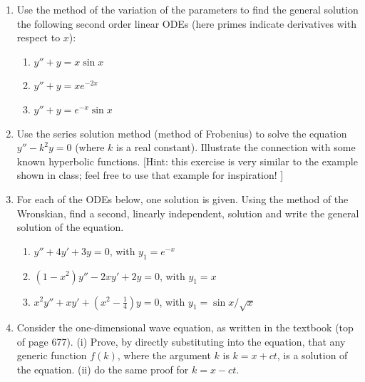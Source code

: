 \documentclass[fleqn]{article}
\begin{document}
  \begin{enumerate}
    \item Use the method of the variation of the parameters to find the general solution the following second order linear ODEs (here primes indicate derivatives with respect to $x$): 
      \begin{enumerate}
      \item $y'' + y = x \sin x$

      \item $y'' + y = x e^{-2x }$

      \item $y'' + y = e^{-x} \sin x$ 
      \end{enumerate}

    \item Use the series solution method (method of Frobenius) to solve the equation $y'' - k^2 y =0$ (where $k$ is a real constant).  Illustrate the connection with some known hyperbolic functions. [Hint: this exercise is very similar to the example shown in class; feel free to use that example for inspiration! ]
    
    \item  For each of the ODEs below, one solution is given. Using the method of the Wronskian, find a second, linearly independent, solution and write the general solution of the equation. 
      \begin{enumerate}
      \item $y'' + 4 y' + 3 y =0 $, with $y_1= e^{-x}$

      \item $(1-x^2) y'' - 2 x y' + 2y=0 $, with $y_1= x $

      \item  $x^2 y'' + x y' + (x^2 - \frac{1}{4})y=0 $, with $y_1=\sin x/\sqrt{x} $
      \end{enumerate}


    \item  Consider the one-dimensional wave equation, as written in the textbook (top of page 677). (i) Prove, by directly substituting  into the equation, that any generic function $f(k)$, where the argument $k$ is $k=x+ct$, is a solution of the equation. (ii) do the same proof for $k=x-ct$. 








  \end{enumerate}
\end{document}
